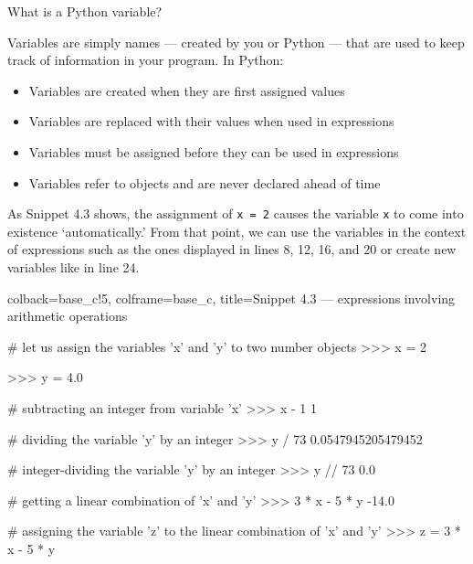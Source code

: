 \documentclass[a4paper,11pt]{book}
\newcommand{\question}[1]{%
    \begin{tcolorbox}[colback=comp_c!10,colframe=comp_c,sidebyside align=top,width=\linewidth,before skip=1ex]
        #1
    \end{tcolorbox}
    \switchcolumn%
}
\newcommand{\note}[1]{%
    \begin{tcolorbox}[colback=white!0,colframe=white!10,width=\linewidth,before skip=1ex]
        #1
    \end{tcolorbox}
}
\begin{document}
\begin{paracol}{2}
	\question{\raggedright What is a Python variable?}
	\note{Variables are simply names --- created by you or Python --- that are used to keep track of information in your program. In Python:
	\begin{itemize}
		\item Variables are created when they are first assigned values
		\item Variables are replaced with their values when used in expressions
		\item Variables must be assigned before they can be used in expressions
		\item Variables refer to objects and are never declared ahead of time
	\end{itemize}
    As Snippet 4.3 shows, the assignment of \texttt{x = 2} causes the variable \texttt{x} to come into existence `automatically.' From that point, we can use the variables in the context of expressions such as the ones displayed in lines 8, 12, 16, and 20 or create new variables like in line 24.
    }
\end{paracol}

\begin{pythoncode}[linenos=true,]{colback=base_c!5, colframe=base_c, title=\sffamily Snippet 4.3 --- expressions involving arithmetic operations}
	
# let us assign the variables 'x' and 'y' to two number objects
>>> x = 2

>>> y = 4.0	

# subtracting an integer from variable 'x'
>>> x - 1
1

# dividing the variable 'y' by an integer
>>> y / 73
0.0547945205479452

# integer-dividing the variable 'y' by an integer
>>> y // 73
0.0

# getting a linear combination of 'x' and 'y'
>>> 3 * x - 5 * y
-14.0

# assigning the variable 'z' to the linear combination of 'x' and 'y'
>>> z = 3 * x - 5 * y

\end{pythoncode}
\clearpage
\end{document}
